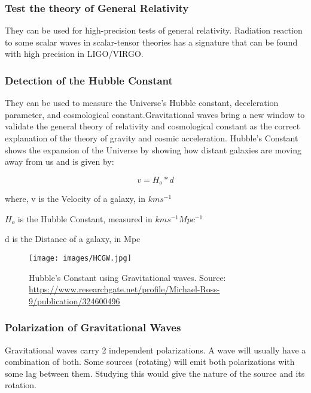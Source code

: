 \subsubsection{Test the theory of General Relativity}
\hspace{1cm}They can be used for high-precision tests of general relativity. Radiation reaction to some scalar waves in scalar-tensor theories has a signature that can be found with high precision in LIGO/VIRGO.

\subsubsection{Detection of the Hubble Constant}
\hspace{1cm}They can be used to measure the Universe’s Hubble constant, deceleration parameter, and cosmological constant.Gravitational waves bring a new window to validate the general theory of relativity and cosmological constant as the correct explanation of the theory of gravity and cosmic acceleration. Hubble's Constant shows the expansion of the Universe by showing how distant galaxies are moving away from us and is given by:
 
\begin{equation}
v = H_o*d
\end{equation}

where, v is the Velocity of a galaxy, in $kms^{-1}$

      $H_{o}$ is the Hubble Constant, measured in $kms^{-1}Mpc^{-1}$
      
      d is the Distance of a galaxy, in Mpc


\vspace{1cm}
\begin{figure}
    \centering
    \texttt{[image: images/HCGW.jpg]}
    \caption{Hubble's Constant using Gravitational waves. Source: \url{https://www.researchgate.net/profile/Michael-Ross-9/publication/324600496}}
\end{figure}
\subsubsection{Polarization of Gravitational Waves}
\hspace{1cm}Gravitational waves carry 2 independent polarizations. A wave will usually have a combination of both. Some sources (rotating) will emit both polarizations with some lag between them. Studying this would give the nature of the source and its rotation.


